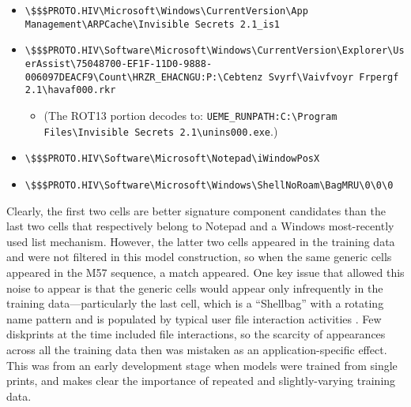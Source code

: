 \documentclass[11pt]{ucthesis}
\theoremstyle{plain}
\theoremstyle{definition}
\newcommand{\breakingbackslash}{\textbackslash\allowbreak{}}
\begin{document}
\begin{itemize}
\item \texttt{{\breakingbackslash}\$\$\$PROTO.HIV{\breakingbackslash}Microsoft{\breakingbackslash}Windows{\breakingbackslash}CurrentVersion{\breakingbackslash}App Management{\breakingbackslash}{\newline}ARPCache{\breakingbackslash}Invisible Secrets 2.1\_is1}
\item \texttt{{\breakingbackslash}\$\$\$PROTO.HIV{\breakingbackslash}Software{\breakingbackslash}Microsoft{\breakingbackslash}Windows{\breakingbackslash}CurrentVersion{\breakingbackslash}Explorer{\newline}{\breakingbackslash}UserAssist{\breakingbackslash}{75048700-EF1F-11D0-9888-006097DEACF9}{\breakingbackslash}Count{\breakingbackslash}{\newline}HRZR\_EHACNGU:P:{\breakingbackslash}Cebtenz Svyrf{\breakingbackslash}Vaivfvoyr Frpergf 2.1{\breakingbackslash}havaf000.rkr} \begin{itemize}
\item (The ROT13 portion decodes to: \texttt{UEME\_RUNPATH:C:{\breakingbackslash}Program Files{\breakingbackslash}{\newline}Invisible Secrets 2.1{\breakingbackslash}unins000.exe}.)
\end{itemize}
\item \texttt{{\breakingbackslash}\$\$\$PROTO.HIV{\breakingbackslash}Software{\breakingbackslash}Microsoft{\breakingbackslash}Notepad{\breakingbackslash}iWindowPosX}
\item \texttt{{\breakingbackslash}\$\$\$PROTO.HIV{\breakingbackslash}Software{\breakingbackslash}Microsoft{\breakingbackslash}Windows{\breakingbackslash}ShellNoRoam{\breakingbackslash}BagMRU{\breakingbackslash}0{\breakingbackslash}0{\breakingbackslash}0}
\end{itemize}

Clearly, the first two cells are better signature component candidates than the last two cells that respectively belong to Notepad and a Windows most-recently used list mechanism.  However, the latter two cells appeared in the training data and were not filtered in this model construction, so when the same generic cells appeared in the M57 sequence, a match appeared.  One key issue that allowed this noise to appear is that the generic cells would appear only infrequently in the training data---particularly the last cell, which is a ``Shellbag'' with a rotating name pattern and is populated by typical user file interaction activities \cite{zhu:dfrws09}.  Few diskprints at the time included file interactions, so the scarcity of appearances across all the training data then was mistaken as an application-specific effect.  This was from an early development stage when models were trained from single prints, and makes clear the importance of repeated and slightly-varying training data.
\end{document}
